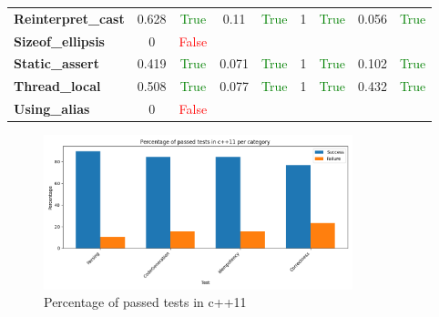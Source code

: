 \documentclass{article}
\begin{document}
\begin{xltabular}{\textwidth}{lcccccccc}
\textbf{{\fontsize{10}{12}\selectfont Reinterpret\_cast}}& 0.628&\textcolor{green}{True}& 0.11&\textcolor{green}{True}& 1&\textcolor{green}{True}& 0.056&\textcolor{green}{True} \\[0.5ex]
\textbf{{\fontsize{10}{12}\selectfont Sizeof\_ellipsis}}& 0&\textcolor{red}{False} \\[0.5ex]
\textbf{{\fontsize{10}{12}\selectfont Static\_assert}}& 0.419&\textcolor{green}{True}& 0.071&\textcolor{green}{True}& 1&\textcolor{green}{True}& 0.102&\textcolor{green}{True} \\[0.5ex]
\textbf{{\fontsize{10}{12}\selectfont Thread\_local}}& 0.508&\textcolor{green}{True}& 0.077&\textcolor{green}{True}& 1&\textcolor{green}{True}& 0.432&\textcolor{green}{True} \\[0.5ex]
\textbf{{\fontsize{10}{12}\selectfont Using\_alias}}& 0&\textcolor{red}{False} \\[0.5ex]
\bottomrule
\end{xltabular}
\newpage
\begin{figure}[h!]
\centering
\includegraphics[width=0.8\textwidth]{../reports/clava/images/c++11_percentage.png}
\caption{Percentage of passed tests in c++11}
\label{fig:c++11_percentage}
\end{figure}
\newpage
\end{document}
